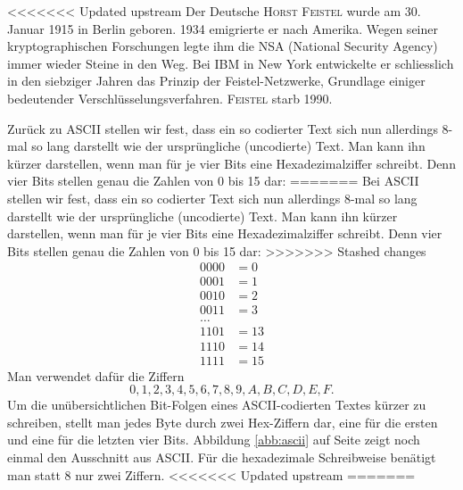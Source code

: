 \documentclass[%
<<<<<<< Updated upstream
11pt,%
twoside,%
titlepage,%
german,%
headsepline%
]{scrartcl}
\begin{document}
<<<<<<< Updated upstream
Der Deutsche \textsc{Horst Feistel} wurde am 30. Januar 1915 in Berlin geboren. 1934 emigrierte er nach Amerika. Wegen seiner kryptographischen Forschungen legte ihm die NSA (National Security Agency) immer wieder Steine in den Weg. Bei IBM in New York entwickelte er schliesslich in den siebziger Jahren das Prinzip der Feistel-Netzwerke, Grundlage einiger bedeutender Verschlüsselungsverfahren. 
\textsc{Feistel} starb 1990.

Zurück zu ASCII stellen wir fest, dass ein so codierter Text sich nun allerdings 8-mal so lang darstellt wie der ursprüngliche (uncodierte) Text. Man kann ihn kürzer darstellen, wenn man für je vier Bits eine Hexadezimalziffer schreibt. Denn vier Bits stellen genau die Zahlen von 0 bis 15 dar:
=======
Bei ASCII stellen wir fest, dass ein so codierter Text sich nun allerdings 8-mal so lang darstellt wie der ursprüngliche (uncodierte) Text. Man kann ihn kürzer darstellen, wenn man für je vier Bits eine Hexadezimalziffer schreibt. Denn vier Bits stellen genau die Zahlen von 0 bis 15 dar:
>>>>>>> Stashed changes
\begin{align*}
0000 &= 0\\
0001 &= 1\\
0010 &= 2\\
0011 &= 3\\
\dots\\
1101 &= 13\\
1110 &= 14\\
1111 &= 15
\end{align*}
Man verwendet dafür die Ziffern
$$0,1,2,3,4,5,6,7,8,9,A,B,C,D,E,F.$$
Um die unübersichtlichen Bit-Folgen eines ASCII-codierten Textes kürzer zu schreiben, stellt man jedes Byte durch zwei Hex-Ziffern dar, eine für die ersten und eine für die letzten vier Bits.
Abbildung \ref{abb:ascii} auf Seite \pageref{abb:ascii} zeigt noch einmal den Ausschnitt aus ASCII. Für die hexadezimale Schreibweise benätigt man statt 8 nur zwei Ziffern.
<<<<<<< Updated upstream
=======
\end{document}
